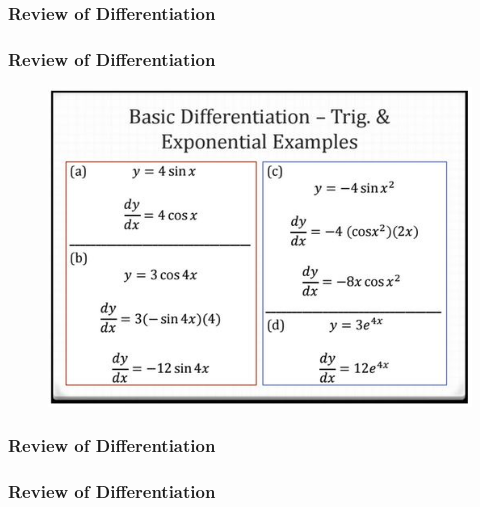 \documentclass{beamer}
\begin{document}
\begin{frame}
	
	\frametitle{Review of Differentiation}
	
\end{frame}
\begin{frame}
	
	\frametitle{Review of Differentiation}
	\begin{figure}
		\centering
		\includegraphics[width=0.95\linewidth]{diff1e}
		
	\end{figure}
\end{frame}
\begin{frame}
	
	\frametitle{Review of Differentiation}
	
\end{frame}

\begin{frame}
	
	\frametitle{Review of Differentiation}
	
\end{frame}
\end{document}
